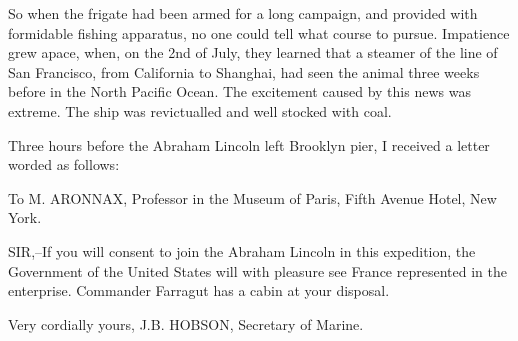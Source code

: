 So when the frigate had been armed for a long campaign, and provided with
formidable fishing apparatus, no one could tell what course to pursue.
Impatience grew apace, when, on the 2nd of July, they learned that a
steamer of the line of San Francisco, from California to Shanghai,
had seen the animal three weeks before in the North Pacific Ocean.
The excitement caused by this news was extreme.  The ship was revictualled
and well stocked with coal.

Three hours before the Abraham Lincoln left Brooklyn pier,
I received a letter worded as follows:

\begin{longquote}
To M. ARONNAX, Professor in the Museum of Paris, Fifth Avenue Hotel, New York.

SIR,--If you will consent to join the Abraham Lincoln
in this expedition, the Government of the United States
will with pleasure see France represented in the enterprise.
Commander Farragut has a cabin at your disposal.

Very cordially yours, J.B. HOBSON, Secretary of Marine.
\end{longquote}
